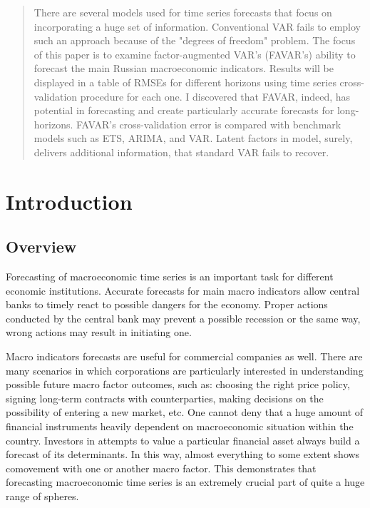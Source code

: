 \documentclass[a4paper, 14pt]{article}
\begin{document}
	
\begin{abstract}
	There are several models used for time series forecasts that focus on incorporating a huge set of information. Conventional VAR fails to employ such an approach because of the "degrees of freedom" problem. The focus of this paper is to examine factor-augmented VAR's (FAVAR's) ability to forecast the main Russian macroeconomic indicators. Results will be displayed in a table of RMSEs for different horizons using time series cross-validation procedure for each one. I discovered that FAVAR, indeed, has potential in forecasting and create particularly accurate forecasts for long-horizons. FAVAR's cross-validation error is compared with benchmark models such as ETS, ARIMA, and VAR. Latent factors in model, surely, delivers additional information, that standard VAR fails to recover.
	
\end{abstract}
\section{Introduction}
\subsection{Overview}
Forecasting of macroeconomic time series is an important task for different economic institutions. Accurate forecasts for main macro indicators allow central banks to timely react to possible dangers for the economy. Proper actions conducted by the central bank may prevent a possible recession or the same way, wrong actions may result in initiating one. 

Macro indicators forecasts are useful for commercial companies as well. There are many scenarios in which corporations are particularly interested in understanding possible future macro factor outcomes, such as: choosing the right price policy, signing long-term contracts with counterparties, making decisions on the possibility of entering a new market, etc. One cannot deny that a huge amount of financial instruments heavily dependent on macroeconomic situation within the country. Investors in attempts to value a particular financial asset always build a forecast of its determinants. In this way, almost everything to some extent shows comovement with one or another macro factor. This demonstrates that forecasting macroeconomic time series is an extremely crucial part of quite a huge range of spheres.  
\end{document}
